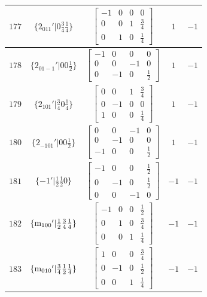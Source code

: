 \documentclass[fleqn,8pt]{jsarticle}
\begin{document}
\begin{longtable}{ccccc}
$ 177 $ & $ \{2{}_{011}{}'|0 \frac{3}{4} \frac{1}{4}\} $ & $ \begin{bmatrix} -1 & 0 & 0 & 0 \\ 0 & 0 & 1 & \frac{3}{4} \\ 0 & 1 & 0 & \frac{1}{4} \end{bmatrix} $ & $ 1 $ & $ -1 $ \\ \hline
$ 178 $ & $ \{2{}_{01-1}{}'|0 0 \frac{1}{2}\} $ & $ \begin{bmatrix} -1 & 0 & 0 & 0 \\ 0 & 0 & -1 & 0 \\ 0 & -1 & 0 & \frac{1}{2} \end{bmatrix} $ & $ 1 $ & $ -1 $ \\ \hline
$ 179 $ & $ \{2{}_{101}{}'|\frac{3}{4} 0 \frac{1}{4}\} $ & $ \begin{bmatrix} 0 & 0 & 1 & \frac{3}{4} \\ 0 & -1 & 0 & 0 \\ 1 & 0 & 0 & \frac{1}{4} \end{bmatrix} $ & $ 1 $ & $ -1 $ \\ \hline
$ 180 $ & $ \{2{}_{-101}{}'|0 0 \frac{1}{2}\} $ & $ \begin{bmatrix} 0 & 0 & -1 & 0 \\ 0 & -1 & 0 & 0 \\ -1 & 0 & 0 & \frac{1}{2} \end{bmatrix} $ & $ 1 $ & $ -1 $ \\ \hline
$ 181 $ & $ \{-1{}'|\frac{1}{2} \frac{1}{2} 0\} $ & $ \begin{bmatrix} -1 & 0 & 0 & \frac{1}{2} \\ 0 & -1 & 0 & \frac{1}{2} \\ 0 & 0 & -1 & 0 \end{bmatrix} $ & $ -1 $ & $ -1 $ \\ \hline
$ 182 $ & $ \{{\rm m}_{100}{}'|\frac{1}{2} \frac{3}{4} \frac{1}{4}\} $ & $ \begin{bmatrix} -1 & 0 & 0 & \frac{1}{2} \\ 0 & 1 & 0 & \frac{3}{4} \\ 0 & 0 & 1 & \frac{1}{4} \end{bmatrix} $ & $ -1 $ & $ -1 $ \\ \hline
$ 183 $ & $ \{{\rm m}_{010}{}'|\frac{3}{4} \frac{1}{2} \frac{1}{4}\} $ & $ \begin{bmatrix} 1 & 0 & 0 & \frac{3}{4} \\ 0 & -1 & 0 & \frac{1}{2} \\ 0 & 0 & 1 & \frac{1}{4} \end{bmatrix} $ & $ -1 $ & $ -1 $ \\ \hline

\end{longtable}
\end{document}
